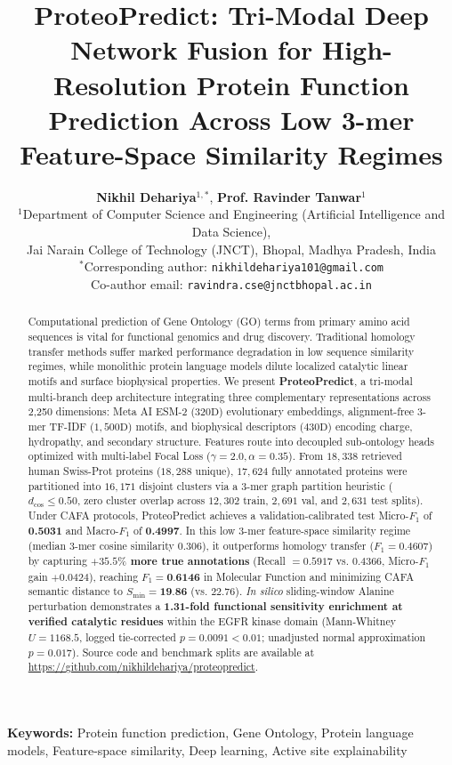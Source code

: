 \documentclass[twocolumn,10pt]{article}
\title{\textbf{\Large ProteoPredict: Tri-Modal Deep Network Fusion for High-Resolution Protein Function Prediction Across Low 3-mer Feature-Space Similarity Regimes}}
\author{
    \textbf{Nikhil Dehariya}$^{1,*}$, \textbf{Prof. Ravinder Tanwar}$^{1}$ \\
    $^{1}$Department of Computer Science and Engineering (Artificial Intelligence and Data Science), \\
    Jai Narain College of Technology (JNCT), Bhopal, Madhya Pradesh, India \\
    $^{*}$Corresponding author: \texttt{nikhildehariya101@gmail.com} \\
    Co-author email: \texttt{ravindra.cse@jnctbhopal.ac.in}
}
\date{}
\begin{document}
\maketitle

\begin{abstract}
Computational prediction of Gene Ontology (GO) terms from primary amino acid sequences is vital for functional genomics and drug discovery. Traditional homology transfer methods suffer marked performance degradation in low sequence similarity regimes, while monolithic protein language models dilute localized catalytic linear motifs and surface biophysical properties. We present \textbf{ProteoPredict}, a tri-modal multi-branch deep architecture integrating three complementary representations across 2,250 dimensions: Meta AI ESM-2 ($320\text{D}$) evolutionary embeddings, alignment-free $3$-mer TF-IDF ($1,500\text{D}$) motifs, and biophysical descriptors ($430\text{D}$) encoding charge, hydropathy, and secondary structure. Features route into decoupled sub-ontology heads optimized with multi-label Focal Loss ($\gamma = 2.0, \alpha = 0.35$). From $18,338$ retrieved human Swiss-Prot proteins ($18,288$ unique), $17,624$ fully annotated proteins were partitioned into $16,171$ disjoint clusters via a $3$-mer graph partition heuristic ($d_{\cos} \le 0.50$, zero cluster overlap across $12,302$ train, $2,691$ val, and $2,631$ test splits). Under CAFA protocols, ProteoPredict achieves a validation-calibrated test Micro-$F_1$ of \textbf{0.5031} and Macro-$F_1$ of \textbf{0.4997}. In this low $3$-mer feature-space similarity regime (median $3$-mer cosine similarity $0.306$), it outperforms homology transfer ($F_1 = 0.4607$) by capturing \textbf{$+35.5\%$ more true annotations} (Recall $= 0.5917$ vs. $0.4366$, Micro-$F_1$ gain $+0.0424$), reaching $F_1 = \textbf{0.6146}$ in Molecular Function and minimizing CAFA semantic distance to $S_{\min} = \textbf{19.86}$ (vs. $22.76$). \textit{In silico} sliding-window Alanine perturbation demonstrates a \textbf{1.31-fold functional sensitivity enrichment at verified catalytic residues} within the EGFR kinase domain (Mann-Whitney $U = 1168.5$, logged tie-corrected $p = 0.0091 < 0.01$; unadjusted normal approximation $p = 0.017$). Source code and benchmark splits are available at \url{https://github.com/nikhildehariya/proteopredict}.
\end{abstract}

\noindent\textbf{Keywords:} Protein function prediction, Gene Ontology, Protein language models, Feature-space similarity, Deep learning, Active site explainability
\end{document}
